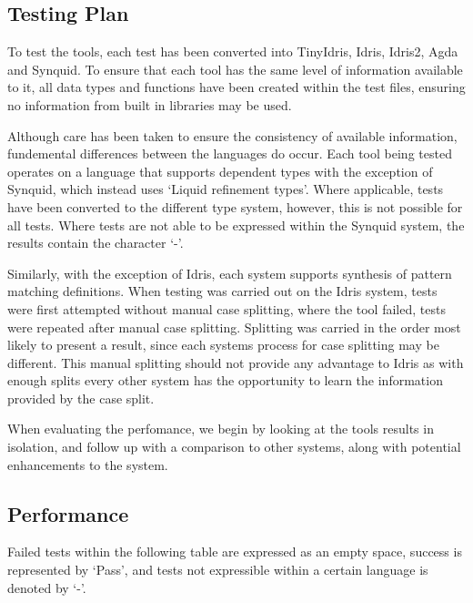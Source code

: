 \documentclass[a4paper]{article}
\begin{document}
\subsection{Testing Plan}

To test the tools, each test has been converted into TinyIdris,
Idris, Idris2, Agda and Synquid. To ensure that each tool has the same level
of information available to it, all data types and functions have been created
within the test files, ensuring no information from built in libraries may be used.

Although care has been taken to ensure the consistency of available information,
fundemental differences between the languages do occur. Each tool being tested
operates on a language that supports dependent types with the exception of Synquid, which
instead uses `Liquid refinement types'. Where applicable, tests have been converted to the
different type system, however, this is not possible for all tests. Where tests are not
able to be expressed within the Synquid system, the results contain the character `-'.

Similarly, with the exception of Idris, each system supports synthesis of
pattern matching definitions. When testing was carried out on the Idris
system, tests were first attempted without manual case splitting,
where the tool failed, tests were repeated after manual
case splitting. Splitting was carried in the order most likely to
present a result, since each systems process for case splitting may be different.
This manual splitting should not provide any advantage to Idris as with enough
splits every other system has the opportunity to learn the information provided by
the case split. 

When evaluating the perfomance, we begin by looking at the tools results in isolation,
and follow up with a comparison to other systems, along with potential enhancements
to the system.

\subsection{Performance}
\label{sec:org9ac3710}

Failed tests within the following table are expressed as an empty space,
success is represented by `Pass', and tests not expressible within a
certain language is denoted by `-'.
 
\end{document}

